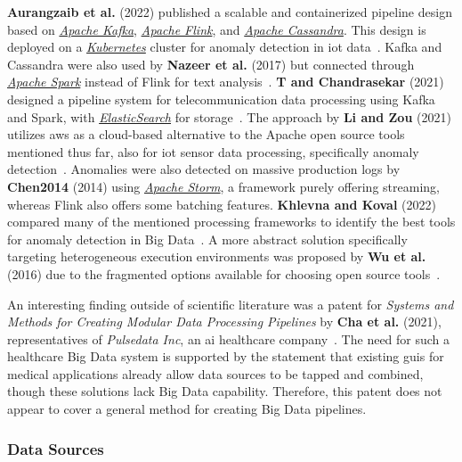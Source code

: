 \textbf{Aurangzaib et al.} (2022) published a scalable and containerized pipeline design based on \href{https://kafka.apache.org/}{\textit{Apache Kafka}}, \href{https://flink.apache.org/}{\textit{Apache Flink}}, and \href{https://cassandra.apache.org/}{\textit{Apache Cassandra}}.
This design is deployed on a \href{https://kubernetes.io/}{\textit{Kubernetes}} cluster for anomaly detection in \ac{iot} data~\cite{Aurangzaib2022}.
Kafka and Cassandra were also used by \textbf{Nazeer et al.} (2017) but connected through \href{https://spark.apache.org/}{\textit{Apache Spark}} instead of Flink for text analysis~\cite{Nazeer2017}.
\textbf{T and Chandrasekar} (2021) designed a pipeline system for telecommunication data processing using Kafka and Spark, with \href{https://www.elastic.co/de/elasticsearch}{\textit{ElasticSearch}} for storage~\cite{T2021}.
The approach by \textbf{Li and Zou} (2021) utilizes \ac{aws} as a cloud-based alternative to the Apache open source tools mentioned thus far, also for \ac{iot} sensor data processing, specifically anomaly detection~\cite{Li2021}.
Anomalies were also detected on massive production logs by \textbf{Chen2014} (2014) using \href{https://storm.apache.org/}{\textit{Apache Storm}}, a framework purely offering streaming, whereas Flink also offers some batching features.
\textbf{Khlevna and Koval} (2022) compared many of the mentioned processing frameworks to identify the best tools for anomaly detection in Big Data~\cite{Khlevna2022}.
A more abstract solution specifically targeting heterogeneous execution environments was proposed by \textbf{Wu et al.} (2016) due to the fragmented options available for choosing open source tools~\cite{Wu2016}.

An interesting finding outside of scientific literature was a patent for \textit{Systems and Methods for Creating Modular Data Processing Pipelines} by \textbf{Cha et al.} (2021), representatives of \textit{Pulsedata Inc}, an \ac{ai} healthcare company~\cite{Cha2021}.
The need for such a healthcare Big Data system is supported by the statement that existing \acp{gui} for medical applications already allow data sources to be tapped and combined, though these solutions lack Big Data capability.
Therefore, this patent does not appear to cover a general method for creating Big Data pipelines.


\subsubsection{Data Sources}
\label{sec:related-work-big-data-datasets}

